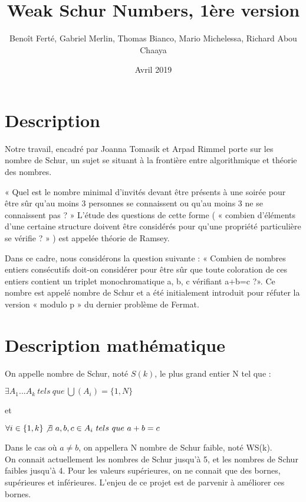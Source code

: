 \documentclass{report}
\title{Weak Schur Numbers, 1ère version}
\author{Benoît Ferté, Gabriel Merlin, Thomas Bianco, Mario Michelessa, Richard Abou Chaaya}
\date{Avril 2019}
\begin{document}
\renewcommand{\thesection}{\arabic{section}} 



\maketitle

\tableofcontents
\newpage

\section{Description}
Notre travail, encadré par Joanna Tomasik et Arpad Rimmel porte sur les nombre de Schur, un sujet se situant à la frontière entre algorithmique et théorie des nombres.


« Quel est le nombre minimal d’invités devant être présents à une soirée pour être sûr qu’au moins 3 personnes se connaissent ou qu’au moins 3 ne se connaissent pas ? » 
L’étude des questions de cette forme ( « combien d'éléments d'une certaine structure doivent être considérés pour qu'une propriété particulière se vérifie ? » ) est appelée théorie de Ramsey. 


Dans ce cadre, nous considérons la question suivante : « Combien de nombres entiers consécutifs doit-on considérer pour être sûr que toute coloration de ces entiers contient un triplet monochromatique a, b, c vérifiant a+b=c ?». Ce nombre est appelé nombre de Schur et a été initialement introduit pour réfuter la version « modulo p » du dernier problème de Fermat. 


\section{Description mathématique}
On appelle nombre de Schur, noté $S(k)$, le plus grand entier N tel que :
\begin{center}
    
$ \exists A_1... A_k \ tels \ que \ \bigcup(A_i) = \{1,N\} $

et

$\forall i\in \{1,k\} \not\exists \ a,b,c\in A_i \ tels \  que \ a+b=c  $

\end{center}
Dans le cas où $a \neq b$, on appellera N nombre de Schur faible, noté WS(k).
\\
On connait actuellement les nombres de Schur jusqu'à 5, et les nombres de Schur faibles jusqu'à 4. Pour les valeurs supérieures, on ne connait que des bornes, supérieures et inférieures. L'enjeu de ce projet est de parvenir à améliorer ces bornes.
\\
\end{document}
